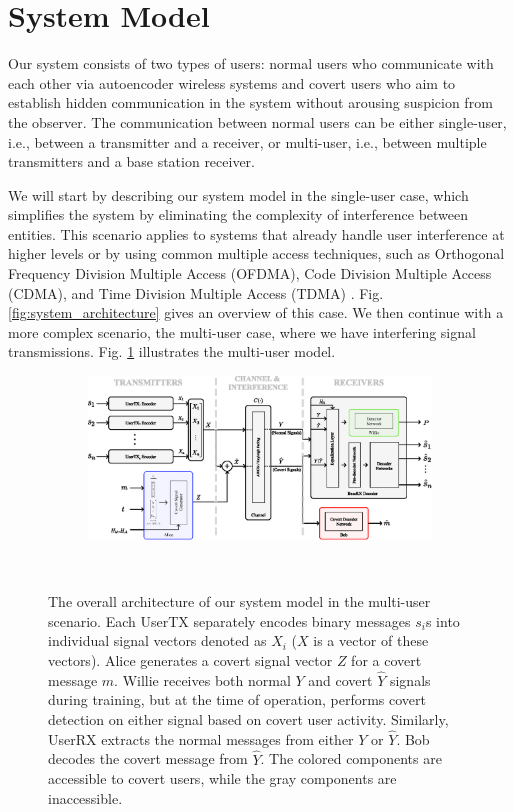 \section{System Model}
\label{s:model}
Our system consists of two types of users: normal users who communicate with each other via autoencoder wireless systems and covert users who aim to establish hidden communication in the system without arousing suspicion from the observer. The communication between normal users can be either single-user, i.e., between a transmitter and a receiver, or multi-user, i.e., between multiple transmitters and a base station receiver.

We will start by describing our system model in the single-user case, which simplifies the system by eliminating the complexity of interference between entities. This scenario applies to systems that already handle user interference at higher levels or by using common multiple access techniques, such as Orthogonal Frequency Division Multiple Access (OFDMA), Code Division Multiple Access (CDMA), and Time Division Multiple Access (TDMA) \cite{WALRAND2000305}. Fig. \ref{fig:system_architecture} gives an overview of this case. We then continue with a more complex scenario, the multi-user case, where we have interfering signal transmissions. Fig. \ref{fig:multi_system_architecture} illustrates the multi-user model.

\begin{figure}[thp]
	\center
	\begin{subfigure}{0.7\textwidth}
		\includegraphics[width=\linewidth]{figs/multi_system_architecture}
	\end{subfigure}
	\\
	\caption{The overall architecture of our system model in the multi-user scenario. Each UserTX separately encodes binary messages $s_i$s into individual signal vectors denoted as $X_i$ ($X$ is a vector of these vectors). Alice generates a covert signal vector $Z$ for a covert message $m$. Willie receives both normal $Y$ and covert $\hat{Y}$ signals during training, but at the time of operation, performs covert detection on either signal based on covert user activity. Similarly, UserRX extracts the normal messages from either $Y$ or $\hat{Y}$. Bob decodes the covert message from $\hat{Y}$. The colored components are accessible to covert users, while the gray components are inaccessible.}
	\label{fig:multi_system_architecture}
\end{figure}



